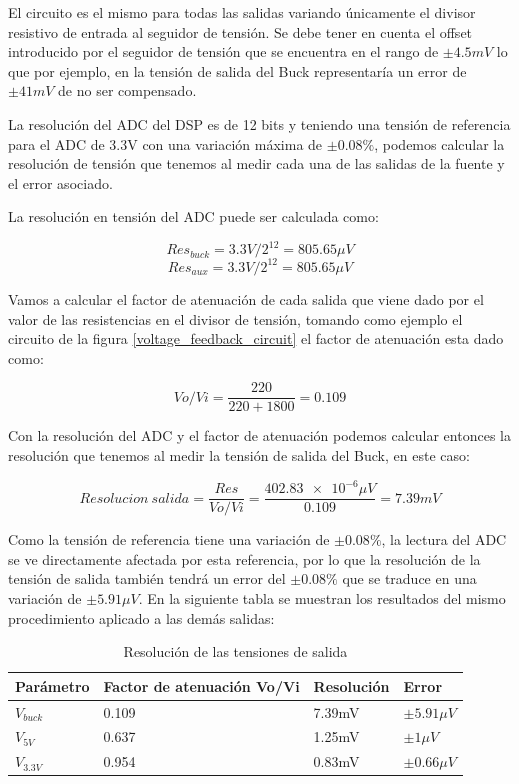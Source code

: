 \documentclass[12pt]{report}
\begin{document}
El circuito es el mismo para todas las salidas variando únicamente el divisor resistivo de entrada al seguidor de tensión. Se debe tener en cuenta el offset introducido por el seguidor de tensión que se encuentra en el rango de $\pm 4.5mV$ lo que por ejemplo, en la tensión de salida del Buck representaría un error de $\pm 41mV$ de no ser compensado.

La resolución del ADC del DSP es de 12 bits y teniendo una tensión de referencia para el ADC de 3.3V con una variación máxima de $\pm0.08\%$, podemos calcular la resolución de tensión que tenemos al medir cada una de las salidas de la fuente y el error asociado.

La resolución en tensión del ADC puede ser calculada como:

\begin{equation}
	Res_{buck} = 3.3V / 2^{12} = 805.65 \mu V
\end{equation}
\begin{equation}
	Res_{aux} = 3.3V / 2^{12} = 805.65 \mu V
\end{equation}

Vamos a calcular el factor de atenuación de cada salida que viene dado por el valor de las resistencias en el divisor de tensión, tomando como ejemplo el circuito de la figura \ref{voltage_feedback_circuit} el factor de atenuación esta dado como:

\begin{equation}
	Vo/Vi = \frac{220}{220 + 1800} = 0.109
\end{equation}

Con la resolución del ADC y el factor de atenuación podemos calcular entonces la resolución que tenemos al medir la tensión de salida del Buck, en este caso:

\begin{equation}
	Resolucion \ salida = \frac{Res}{Vo/Vi} = \frac{\num{402.83e-6} \mu V}{0.109} = 7.39mV
\end{equation}

Como la tensión de referencia tiene una variación de $\pm0.08\%$, la lectura del ADC se ve directamente afectada por esta referencia, por lo que la resolución de la tensión de salida también tendrá un error del $\pm0.08\%$ que se traduce en una variación de $\pm5.91 \mu V$. En la siguiente tabla se muestran los resultados del mismo procedimiento aplicado a las demás salidas:

\begin{table}[H]
	\centering
	\begin{tabular}{M{2cm}M{5cm}M{3cm}M{3cm}} \toprule
		Parámetro & Factor de atenuación Vo/Vi & Resolución & Error 
		\\ \midrule
		$V_{buck}$ & 0.109 & 7.39mV & $\pm5.91 \mu V$ \\
		$V_{5V}$ & 0.637 & 1.25mV & $\pm1 \mu V$ \\
		$V_{3.3V}$ & 0.954 & 0.83mV & $\pm0.66 \mu V$ \\
		\bottomrule
	\end{tabular}
	\caption{Resolución de las tensiones de salida}
\end{table}
\end{document}
